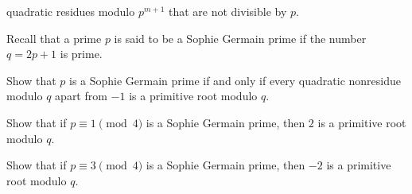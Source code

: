 \begin{challenge}
\begin{subexenum}
\begin{equation*}
  \end{equation*}
  quadratic residues modulo $p^{m+1}$ that are not divisible by $p$.
  \end{subexenum}
  \exercise \label{exercise:quadratic-residues-sophie-germain-primes}Recall that a prime $p$ is said to be a Sophie Germain prime if the number $q=2p+1$ is prime.
  \begin{subexenum}
  \item Show that $p$ is a Sophie Germain prime if and only if every quadratic nonresidue modulo $q$ apart from $-1$ is a primitive root modulo $q$.
  \item Show that if $p\equiv 1\pmod{4}$ is a Sophie Germain prime, then $2$ is a primitive root modulo $q$.
  \item Show that if $p\equiv 3\pmod{4}$ is a Sophie Germain prime, then $-2$ is a primitive root modulo $q$.
  \end{subexenum}  
\end{challenge}

